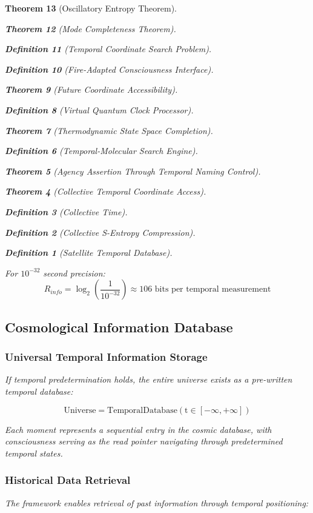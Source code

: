 \documentclass[12pt,a4paper]{article}
\newtheorem{theorem}{Theorem}[section]
\newtheorem{definition}[theorem]{Definition}
\begin{document}
\begin{theorem}[Oscillatory Entropy Theorem]
\begin{theorem}[Mode Completeness Theorem]
\begin{enumerate}
\begin{definition}[Temporal Coordinate Search Problem]
\begin{algorithm}
\begin{definition}[Fire-Adapted Consciousness Interface]
\begin{theorem}[Future Coordinate Accessibility]
\begin{definition}[Virtual Quantum Clock Processor]
\begin{itemize}
\begin{itemize}
\begin{theorem}[Thermodynamic State Space Completion]
\begin{definition}[Temporal-Molecular Search Engine]
\begin{theorem}[Agency Assertion Through Temporal Naming Control]
\begin{remark}
\begin{theorem}[Collective Temporal Coordinate Access]
\begin{definition}[Collective Time]
\begin{definition}[Collective S-Entropy Compression]
\begin{definition}[Satellite Temporal Database]
\begin{algorithm}
\begin{table}[h]
{{For $10^{-32}$ second precision:
$$R_{info} = \log_2\left(\frac{1}{10^{-32}}\right) \approx 106 \text{ bits per temporal measurement}$$

\subsection{Cosmological Information Database}

\subsubsection{Universal Temporal Information Storage}

If temporal predetermination holds, the entire universe exists as a pre-written temporal database:

\begin{equation}
\text{Universe} = \text{TemporalDatabase}(\text{t} \in [-\infty, +\infty])
\end{equation}

Each moment represents a sequential entry in the cosmic database, with consciousness serving as the read pointer navigating through predetermined temporal states.

\subsubsection{Historical Data Retrieval}

The framework enables retrieval of past information through temporal positioning:

}}
\end{table}
\end{algorithm}
\end{definition}
\end{definition}
\end{definition}
\end{theorem}
\end{remark}
\end{theorem}
\end{definition}
\end{theorem}
\end{itemize}
\end{itemize}
\end{definition}
\end{theorem}
\end{definition}
\end{algorithm}
\end{definition}
\end{enumerate}
\end{theorem}
\end{theorem}
\end{document}
